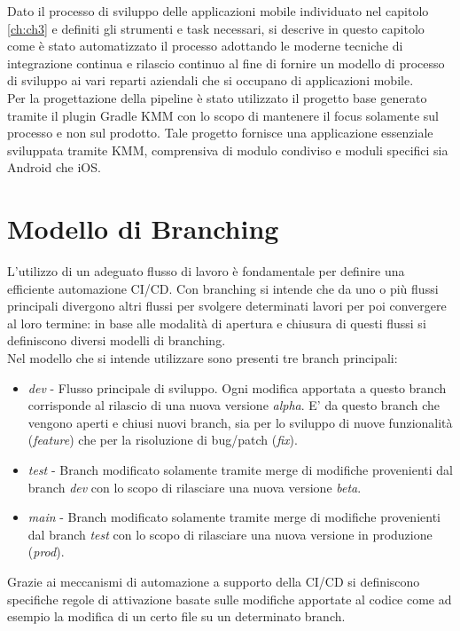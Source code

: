 
Dato il processo di sviluppo delle applicazioni mobile individuato nel capitolo \ref{ch:ch3} e definiti gli strumenti e task necessari, si descrive in questo capitolo come è stato automatizzato il processo adottando le moderne tecniche di integrazione continua e rilascio continuo al fine di fornire un modello di processo di sviluppo ai vari reparti aziendali che si occupano di applicazioni mobile.\\
Per la progettazione della pipeline è stato utilizzato il progetto base generato tramite il plugin Gradle KMM con lo scopo di mantenere il focus solamente sul processo e non sul prodotto. Tale progetto fornisce una applicazione essenziale sviluppata tramite KMM, comprensiva di modulo condiviso e moduli specifici sia Android che iOS.

\section{Modello di Branching}
L'utilizzo di un adeguato flusso di lavoro è fondamentale per definire una efficiente automazione CI/CD. Con branching si intende che da uno o più flussi principali divergono altri flussi per svolgere determinati lavori per poi convergere al loro termine: in base alle modalità di apertura e chiusura di questi flussi si definiscono diversi modelli di branching.\\
Nel modello che si intende utilizzare sono presenti tre branch principali:
\begin{itemize}
    \item \textit{dev} - Flusso principale di sviluppo. Ogni modifica apportata a questo branch corrisponde al rilascio di una nuova versione \textit{alpha}. E' da questo branch che vengono aperti e chiusi nuovi branch, sia per lo sviluppo di nuove funzionalità (\textit{feature}) che per la risoluzione di bug/patch (\textit{fix}).
    \item \textit{test} - Branch modificato solamente tramite merge di modifiche provenienti dal branch \textit{dev} con lo scopo di rilasciare una nuova versione \textit{beta}.
    \item \textit{main} - Branch modificato solamente tramite merge di modifiche provenienti dal branch \textit{test} con lo scopo di rilasciare una nuova versione in produzione (\textit{prod}).
\end{itemize}

Grazie ai meccanismi di automazione a supporto della CI/CD si definiscono specifiche regole di attivazione basate sulle modifiche apportate al codice come ad esempio la modifica di un certo file su un determinato branch.

